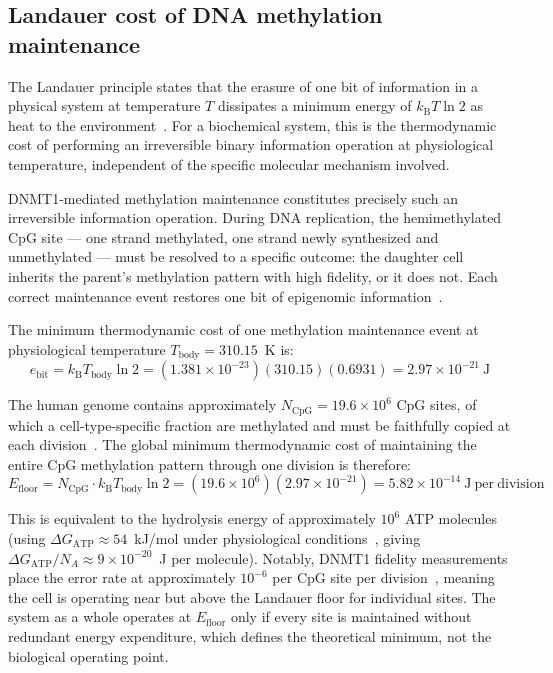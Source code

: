 \documentclass[12pt,a4paper]{article}
\newcommand{\Efloor}{E_{\mathrm{floor}}}
\newcommand{\Tbody}{T_{\mathrm{body}}}
\newcommand{\kB}{k_{\mathrm{B}}}
\newcommand{\dGATP}{\Delta G_{\mathrm{ATP}}}
\newcommand{\NcpG}{N_{\mathrm{CpG}}}
\begin{document}
\subsection{Landauer cost of DNA methylation maintenance}
\label{sec:landauer}

The Landauer principle states that the erasure of one bit of information in
a physical system at temperature $T$ dissipates a minimum energy of
$\kB T \ln 2$ as heat to the environment~\cite{Landauer1961,Bennett1982}.
For a biochemical system, this is the thermodynamic cost of performing an
irreversible binary information operation at physiological temperature,
independent of the specific molecular mechanism involved.

DNMT1-mediated methylation maintenance constitutes precisely such an irreversible
information operation. During DNA replication, the hemimethylated CpG site
--- one strand methylated, one strand newly synthesized and unmethylated ---
must be resolved to a specific outcome: the daughter cell inherits the parent's
methylation pattern with high fidelity, or it does not. Each correct maintenance
event restores one bit of epigenomic information~\cite{Bestor2000,Jurkowska2011}.

The minimum thermodynamic cost of one methylation maintenance event at
physiological temperature $\Tbody = 310.15$~K is:
\begin{equation}
  e_{\mathrm{bit}} = \kB \Tbody \ln 2 = (1.381 \times 10^{-23})(310.15)(0.6931)
  = 2.97 \times 10^{-21}~\mathrm{J}
  \label{eq:ebit}
\end{equation}

The human genome contains approximately $\NcpG = 19.6 \times 10^6$ CpG sites,
of which a cell-type-specific fraction are methylated and must be faithfully
copied at each division~\cite{Lister2009,Roadmap2015,ENCODE2012}. The global minimum
thermodynamic cost of maintaining the entire CpG methylation pattern through
one division is therefore:
\begin{equation}
  \Efloor = \NcpG \cdot \kB \Tbody \ln 2 = (19.6 \times 10^6)(2.97 \times 10^{-21})
  = 5.82 \times 10^{-14}~\mathrm{J~per~division}
  \label{eq:efloor}
\end{equation}

This is equivalent to the hydrolysis energy of approximately $10^6$ ATP molecules
(using $\dGATP \approx 54$~kJ/mol under physiological conditions~\cite{Alberty2003}, giving
$\dGATP / N_A \approx 9 \times 10^{-20}$~J per molecule). Notably, DNMT1
fidelity measurements place the error rate at approximately $10^{-6}$ per CpG
site per division~\cite{Ushijima2003,Genereux2005}, meaning the cell is
operating near but above the Landauer floor for individual sites. The system
as a whole operates at $\Efloor$ only if every site is maintained without
redundant energy expenditure, which defines the theoretical minimum, not the
biological operating point.
\end{document}
